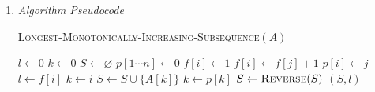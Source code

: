 \documentclass[10pt, letterpaper]{article}
\begin{document}
\begin{enumerate}[label={\bfseries Q\arabic*.}]
\begin{enumerate}
      \item
        {\itshape Algorithm Pseudocode} \vspace{-4mm}
        \begin{center}
          \begin{minipage}{\linewidth}
            \begin{algorithm}[H]
              \caption{\textsc{Longest-Monotonically-Increasing-Subsequence}$(A)$}\label{alg:longest-monotonically-increasing-subsequence}
              \begin{algorithmic}[1]
                \State $l \gets 0$
                \State $k \gets 0$
                \State $S \gets \varnothing$
                \State $p[1 \cdots n] \gets 0$ 
                \State
                  \State $f[i] \gets 1$
                      \State $f[i] \gets f[j] + 1$
                      \State $p[i] \gets j$
                    \EndIf
                  \EndFor
                    \State $l \gets f[i]$
                    \State $k \gets i$
                  \EndIf
                \EndFor
                \State
                \Repeat
                  \State $S \gets S \cup \{A[k]\}$
                  \State $k \gets p[k]$
                \State
                \State $S \gets \textsc{Reverse}(S)$
                \State \Return $(S, l)$
              \end{algorithmic}
            \end{algorithm}
          \end{minipage}
        \end{center}
    \end{enumerate}
\end{enumerate}
\end{document}
